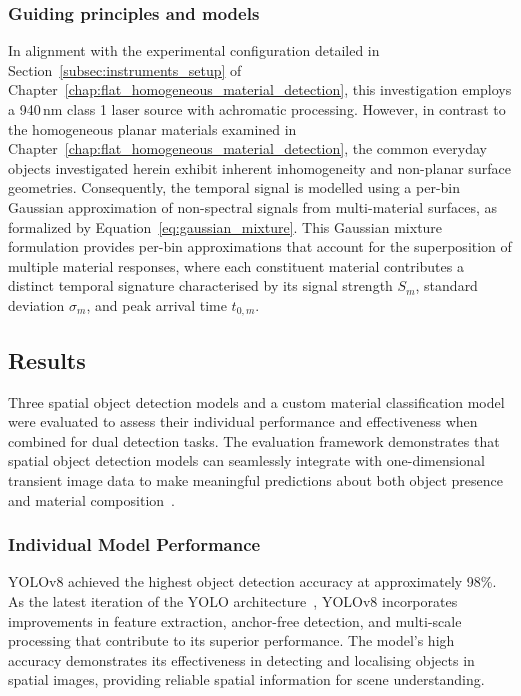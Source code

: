 \documentclass[12pt,a4paper,oneside]{report}
\begin{document}
\subsubsection{Guiding principles and models}
\label{subsec:ch5_guiding_principles_models}

In alignment with the experimental configuration detailed in Section~\ref{subsec:instruments_setup} of Chapter~\ref{chap:flat_homogeneous_material_detection}, this investigation employs a 940\,nm class 1 laser source with achromatic processing. However, in contrast to the homogeneous planar materials examined in Chapter~\ref{chap:flat_homogeneous_material_detection}, the common everyday objects investigated herein exhibit inherent inhomogeneity and non-planar surface geometries. Consequently, the temporal signal is modelled using a per-bin Gaussian approximation of non-spectral signals from multi-material surfaces, as formalized by Equation~\eqref{eq:gaussian_mixture}. This Gaussian mixture formulation provides per-bin approximations that account for the superposition of multiple material responses, where each constituent material contributes a distinct temporal signature characterised by its signal strength $S_m$, standard deviation $\sigma_m$, and peak arrival time $t_{0,m}$.


\subsection{Results}
\label{sec:results}

Three spatial object detection models and a custom material classification model were evaluated to assess their individual performance and effectiveness when combined for dual detection tasks. The evaluation framework demonstrates that spatial object detection models can seamlessly integrate with one-dimensional transient image data to make meaningful predictions about both object presence and material composition~\cite{depthpro2024,gyongy2021}.

\subsubsection{Individual Model Performance}
\label{subsec:individual_model_performance}

YOLOv8 achieved the highest object detection accuracy at approximately 98\%. As the latest iteration of the YOLO architecture~\cite{redmon2016,redmon2018}, YOLOv8 incorporates improvements in feature extraction, anchor-free detection, and multi-scale processing that contribute to its superior performance. The model's high accuracy demonstrates its effectiveness in detecting and localising objects in spatial images, providing reliable spatial information for scene understanding.
\end{document}
